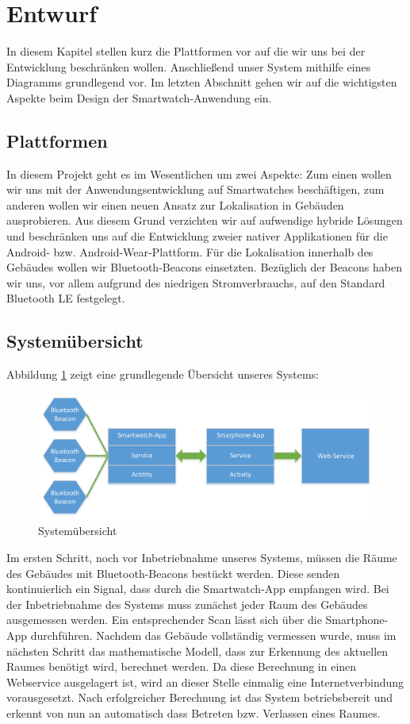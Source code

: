 \section{Entwurf}
In diesem Kapitel stellen kurz die Plattformen vor auf die wir uns bei der Entwicklung beschränken wollen. Anschließend unser System mithilfe eines Diagramms grundlegend vor. Im letzten Abschnitt gehen wir auf die wichtigsten Aspekte beim Design der Smartwatch-Anwendung ein.

\subsection{Plattformen}
In diesem Projekt geht es im Wesentlichen um zwei Aspekte: Zum einen wollen wir uns mit der Anwendungsentwicklung auf Smartwatches beschäftigen, zum anderen wollen wir einen neuen Ansatz zur Lokalisation in Gebäuden ausprobieren. Aus diesem Grund verzichten wir auf aufwendige hybride Lösungen und beschränken uns auf die Entwicklung zweier nativer Applikationen für die Android- bzw. Android-Wear-Plattform. Für die Lokalisation innerhalb des Gebäudes wollen wir Bluetooth-Beacons einsetzten. Bezüglich der Beacons haben wir uns, vor allem aufgrund des niedrigen Stromverbrauchs, auf den Standard Bluetooth LE festgelegt.

\subsection{Systemübersicht}
Abbildung \ref{fig:Übersicht} zeigt eine grundlegende Übersicht unseres Systems:

\begin{figure}[H]
\centering
\includegraphics[width=0.95\linewidth]{Bilder/Uebersicht}
\caption{Systemübersicht}
\label{fig:Übersicht}
\end{figure}

Im ersten Schritt, noch vor Inbetriebnahme unseres Systems, müssen die Räume des Gebäudes mit Bluetooth-Beacons bestückt werden. Diese senden kontinuierlich ein Signal, dass durch die Smartwatch-App empfangen wird. Bei der Inbetriebnahme des Systems muss zunächst jeder Raum des Gebäudes ausgemessen werden. Ein entsprechender Scan lässt sich über die Smartphone-App durchführen. Nachdem das Gebäude vollständig vermessen wurde, muss im nächsten Schritt das mathematische Modell, dass zur Erkennung des aktuellen Raumes benötigt wird, berechnet werden. Da diese Berechnung in einen Webservice ausgelagert ist, wird an dieser Stelle einmalig eine Internetverbindung vorausgesetzt. Nach erfolgreicher Berechnung ist das System betriebsbereit und erkennt von nun an automatisch dass Betreten bzw. Verlassen eines Raumes.

